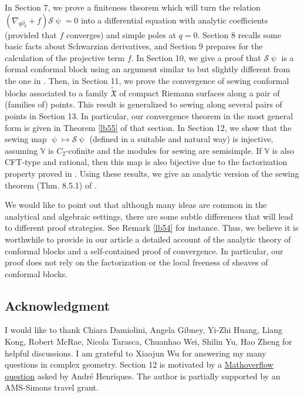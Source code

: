 \documentclass[12pt,a4paper,notitlepage]{article}
\theoremstyle{definition}
\theoremstyle{plain}
\newcommand{\fk}{\mathfrak}
\newcommand{\mc}{\mathcal}
\newcommand{\wtd}{\widetilde}
\newcommand{\Vbb}{\mathbb V}
\numberwithin{equation}{section}
\begin{document}
In Section 7, we prove a finiteness theorem which will turn the relation $(\nabla_{q\partial_q}+f)\mc S\uppsi=0$ into a differential equation with analytic coefficients (provided that $f$ converges) and simple poles at $q=0$. Section 8 recalls some basic facts about Schwarzian derivatives, and Section 9 prepares for the calculation of the projective term $f$. In Section 10, we give a proof that $\mc S\uppsi$ is a formal conformal block using an argument similar to but slightly different from the one in \cite{DGT19b}. Then, in Section 11,  we prove the convergence of sewing conformal blocks associated to a family $\wtd{\fk X}$ of compact Riemann surfaces along a pair of (families of) points. This result is generalized to sewing along several pairs of points in Section 13. In particular, our convergence theorem in the most general form is given in Theorem \ref{lb55} of that section. In Section 12, we show that the sewing map $\uppsi\mapsto\mc S\uppsi$ (defined in a suitable and natural way) is injective, assuming $\Vbb$ is $C_2$-cofinite and the modules for sewing are semisimple.  If $\Vbb$ is also CFT-type and rational, then this map is also bijective due to the factorization property proved in \cite{DGT19b}.  Using these results, we give an analytic version of the sewing theorem (Thm. 8.5.1) of \cite{DGT19b}.



We would like to point out that although many ideas are common in the analytical and algebraic settings, there are some subtle differences that will lead to different proof strategies. See Remark \ref{lb54} for instance. Thus, we believe it is worthwhile to provide in our article a detailed  account of the analytic theory of conformal blocks and a self-contained proof of convergence. In particular, our proof does not rely on the factorization or the local freeness of sheaves of conformal blocks.







\subsection*{Acknowledgment}

I would like to thank Chiara Damiolini, Angela Gibney, Yi-Zhi Huang, Liang Kong, Robert McRae, Nicola Tarasca, Chuanhao Wei, Shilin Yu, Hao Zheng for helpful discussions. I am grateful to Xiaojun Wu for answering my many questions in complex geometry. Section 12 is motivated by a  \href{https://mathoverflow.net/questions/300460/linear-independence-of-genus-one-correlation-functions/321362#321362}{Mathoverflow question}  asked by Andr\'e Henriques. The author is partially supported by an AMS-Simons travel grant.
\end{document}
